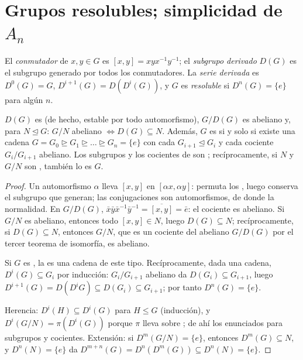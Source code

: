 \section{Grupos resolubles; simplicidad de \texorpdfstring{$A_n$}{An}}

\begin{definition}\label{def:b3:groups:derived}
El \emph{conmutador} de $x, y \in G$ es $[x,y]
= xyx^{-1}y^{-1}$; el \emph{subgrupo derivado}
$D(G)$ es el subgrupo generado por todos los conmutadores. La
\emph{serie derivada} es $D^0(G) = G$, $D^{i+1}(G) = D(D^i(G))$, y $G$
es \emph{resoluble} si $D^n(G) =
\{e\}$ para algún $n$.
\end{definition}

\begin{proposition}\label{prop:b3:groups:derived}
$D(G)$ es  (de hecho, estable por
todo automorfismo), $G/D(G)$ es abeliano y, para $N \trianglelefteq G$:
$G/N$ abeliano $\iff
D(G) \subseteq N$. Además, $G$ es
 si y solo si existe una cadena
$G = G_0 \trianglerighteq G_1 \trianglerighteq \dots
\trianglerighteq G_n = \{e\}$ con cada $G_{i+1} \trianglelefteq
G_i$ y cada cociente $G_i/G_{i+1}$ abeliano. Los subgrupos y los
cocientes de  son
; recíprocamente, si $N$ y
$G/N$ son , también lo es $G$.
\end{proposition}

\begin{proof}
Un automorfismo $\alpha$ lleva $[x,y]$ en $[\alpha x, \alpha y]$:
permuta los , luego conserva
el subgrupo que generan; las conjugaciones son automorfismos, de donde
la normalidad. En $G/D(G)$,
$\bar x\bar y \bar x^{-1}\bar y^{-1} = \overline{[x,y]} = \bar e$:
el cociente es abeliano. Si $G/N$ es abeliano, entonces todo $[x,y] \in
N$, luego $D(G) \subseteq N$; recíprocamente, si $D(G) \subseteq N$,
entonces $G/N$, que es un cociente del abeliano $G/D(G)$ por el tercer
teorema de isomorfía, es abeliano.

Si $G$ es , la
 es una cadena de este
tipo. Recíprocamente, dada una cadena, $D^i(G) \subseteq G_i$ por
inducción: $G_i/G_{i+1}$ abeliano da $D(G_i) \subseteq G_{i+1}$, luego
$D^{i+1}(G) = D(D^i G)
\subseteq D(G_i) \subseteq G_{i+1}$; por tanto $D^n(G) = \{e\}$.

Herencia: $D^i(H) \subseteq D^i(G)$ para $H \leq G$ (inducción), y
$D^i(G/N) = \pi(D^i(G))$ porque $\pi$ lleva
 sobre
; de ahí los enunciados para
subgrupos y cocientes. Extensión: si $D^m(G/N) = \{e\}$, entonces
$D^m(G) \subseteq N$, y $D^n(N) = \{e\}$ da
$D^{m+n}(G) = D^n(D^m(G)) \subseteq D^n(N)
= \{e\}$.
\end{proof}

